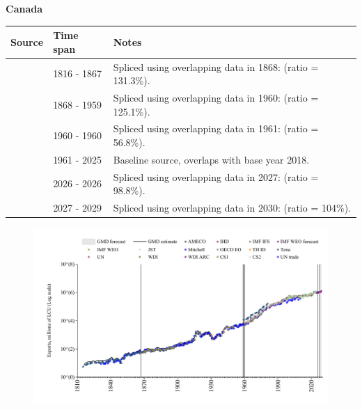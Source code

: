 \documentclass[12pt,a4paper,landscape]{article}
\begin{document}
\begin{adjustbox}{max totalsize={\paperwidth}{\paperheight},center}
\begin{minipage}[t][\textheight][t]{\textwidth}
\vspace*{0.5cm}
{}
\begin{center}
{\Large\bfseries Canada}
\end{center}
\vspace{0.5cm}
\begin{table}[H]
\centering
\small
\begin{tabular}{|l|l|l|}
\hline
\textbf{Source} & \textbf{Time span} & \textbf{Notes} \\
\hline
\rowcolor{white}\cite{Tena}& 1816 - 1867 &Spliced using overlapping data in 1868: (ratio = 131.3\%).\\
\rowcolor{lightgray}\cite{CS1_CAN}& 1868 - 1959 &Spliced using overlapping data in 1960: (ratio = 125.1\%).\\
\rowcolor{white}\cite{AMECO}& 1960 - 1960 &Spliced using overlapping data in 1961: (ratio = 56.8\%).\\
\rowcolor{lightgray}\cite{OECD_EO}& 1961 - 2025 &Baseline source, overlaps with base year 2018.\\
\rowcolor{white}\cite{AMECO}& 2026 - 2026 &Spliced using overlapping data in 2027: (ratio = 98.8\%).\\
\rowcolor{lightgray}\cite{IMF_WEO_forecast}& 2027 - 2029 &Spliced using overlapping data in 2030: (ratio = 104\%).\\
\hline
\end{tabular}
\end{table}
\begin{figure}[H]
\centering
\includegraphics[width=\textwidth,height=0.6\textheight,keepaspectratio]{graphs/CAN_exports.pdf}
\end{figure}
\end{minipage}
\end{adjustbox}
\end{document}
